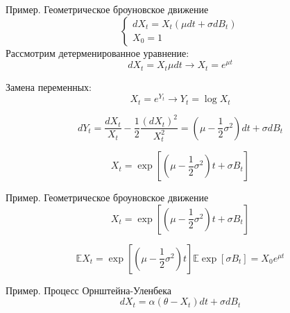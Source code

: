 \documentclass[aspectratio=169]{beamer}
\begin{document}
\begin{frame}{Пример. Геометрическое броуновское движение}
    $$\begin{cases}
            dX_t = X_t \left( \mu dt + \sigma dB_t \right) \\
            X_0 = 1
    \end{cases}$$
      Рассмотрим детерменированное уравнение:
    $$
        dX_t = X_t \mu dt \to X_t = e^{\mu t}
    $$
     
    Замена переменных:
    $$X_t = e^{Y_t} \longrightarrow  Y_t = \log X_t$$
      
    $$d Y_t = \dfrac{d X_t}{X_t} - \dfrac{1}{2} \dfrac{(dX_t)^2}{X_t^2} =\left( \mu - \dfrac{1}{2}\sigma^2 \right) dt + \sigma dB_t$$
     
    $$X_t = \exp\left[ \left( \mu - \dfrac{1}{2}\sigma^2 \right) t + \sigma B_t \right]$$
\end{frame}

\begin{frame}{Пример. Геометрическое броуновское движение}
    $$X_t = \exp\left[ \left( \mu - \dfrac{1}{2}\sigma^2 \right) t + \sigma B_t \right]$$
    
    $$
        \mathbb{E} X_t =   \exp \left[ \left( \mu - \dfrac{1}{2}\sigma^2 \right) t \right] \mathbb{E} \exp \left[
            \sigma B_t
        \right] = X_0 e^{\mu t}
    $$
\end{frame}

\begin{frame}{Пример. Процесс Орнштейна-Уленбека}
    $$
        d X_t = \alpha (\theta - X_t) dt + \sigma dB_t
    $$

\end{frame}
\end{document}
